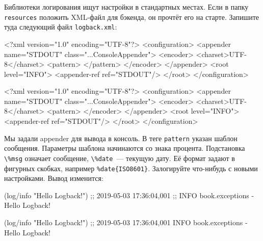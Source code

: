 
Библиотеки логирования ищут настройки в стандартных местах. Если в папку
\verb|resources| положить XML-файл для бэкенда, он прочтёт его на
старте. Запишите туда следующий файл \verb|logback.xml|:

\ifx\DEVICETYPE\MOBILE

\begin{english}
  \begin{xml}
<?xml version="1.0" encoding="UTF-8"?>
<configuration>
  <appender name="STDOUT"
    class="...ConsoleAppender">
    <encoder>
      <charset>UTF-8</charset>
      <pattern>
      </pattern>
    </encoder>
  </appender>
  <root level="INFO">
    <appender-ref ref="STDOUT"/>
  </root>
</configuration>
  \end{xml}
\end{english}

\else

\begin{english}
  \begin{xml}
<?xml version="1.0" encoding="UTF-8"?>
<configuration>
  <appender name="STDOUT" class="...ConsoleAppender">
    <encoder>
      <charset>UTF-8</charset>
      <pattern>%
    </encoder>
  </appender>
  <root level="INFO">
    <appender-ref ref="STDOUT"/>
  </root>
</configuration>
  \end{xml}
\end{english}

\fi


Мы задали appender для вывода в консоль. В теге \verb|pattern| указан шаблон
сообщения. Параметры шаблона начинаются со знака процента. Подстановка
\verb|\%msg| означает сообщение, \verb|\%date|~--- текущую дату. Её
формат задают в фигурных скобках, например \verb|%date{ISO8601}|. Залогируйте
что-нибудь с новыми настройками. Вывод изменится:

\ifx\DEVICETYPE\MOBILE

\begin{english}
  \begin{clojure}
(log/info "Hello Logback!")
;; 2019-05-03 17:36:04,001
;; INFO book.exceptions - Hello Logback!
  \end{clojure}
\end{english}

\else

\begin{english}
  \begin{clojure}
(log/info "Hello Logback!")
;; 2019-05-03 17:36:04,001 INFO book.exceptions - Hello Logback!
  \end{clojure}
\end{english}

